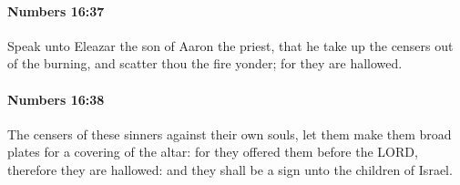 		\paragraph{Numbers 16:37} %
			\label{NUMBERS-16-37}

			Speak unto Eleazar the son of Aaron the priest, that he take up the censers out of the burning, and scatter thou the fire yonder; for they are hallowed.


		\paragraph{Numbers 16:38} %
			\label{NUMBERS-16-38}

			The censers of these sinners against their own souls, let them make them broad plates for a covering of the altar: for they offered them before the LORD, therefore they are hallowed: and they shall be a sign unto the children of Israel.

